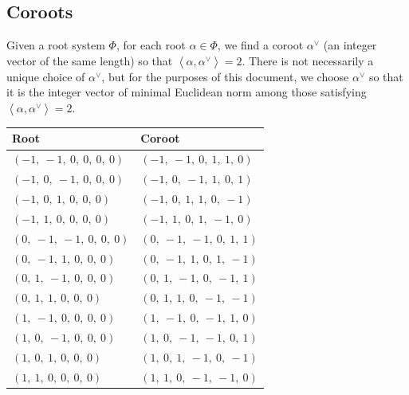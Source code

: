 \documentclass[11pt]{article}
\newcommand{\la}{\left\langle}
\newcommand{\ra}{\right\rangle}
\theoremstyle{definition}
\begin{document}
\subsection{Coroots}

Given a root system $\Phi$, for each root $\alpha \in \Phi$, we find a coroot $\alpha^\vee$ (an integer vector of the same length) so that $\la \alpha, \alpha^\vee \ra = 2$. There is not necessarily a unique choice of $\alpha^\vee$, but for the purposes of this document, we choose $\alpha^\vee$ so that it is the integer vector of minimal Euclidean norm among those satisfying $\la \alpha, \alpha^\vee \ra = 2$.

\bigskip

\noindent \begin{tabular}{|l|l|}
    \hline
    \textbf{Root} & \textbf{Coroot} \\
    \hline
    $\left( -1, \  -1, \  0, \  0, \  0, \  0\right)$ & $\left( -1, \  -1, \  0, \  1, \  1, \  0\right)$ \\
    \hline
    $\left( -1, \  0, \  -1, \  0, \  0, \  0\right)$ & $\left( -1, \  0, \  -1, \  1, \  0, \  1\right)$ \\
    \hline
    $\left( -1, \  0, \  1, \  0, \  0, \  0\right)$ & $\left( -1, \  0, \  1, \  1, \  0, \  -1\right)$ \\
    \hline
    $\left( -1, \  1, \  0, \  0, \  0, \  0\right)$ & $\left( -1, \  1, \  0, \  1, \  -1, \  0\right)$ \\
    \hline
    $\left( 0, \  -1, \  -1, \  0, \  0, \  0\right)$ & $\left( 0, \  -1, \  -1, \  0, \  1, \  1\right)$ \\
    \hline
    $\left( 0, \  -1, \  1, \  0, \  0, \  0\right)$ & $\left( 0, \  -1, \  1, \  0, \  1, \  -1\right)$ \\
    \hline
    $\left( 0, \  1, \  -1, \  0, \  0, \  0\right)$ & $\left( 0, \  1, \  -1, \  0, \  -1, \  1\right)$ \\
    \hline
    $\left( 0, \  1, \  1, \  0, \  0, \  0\right)$ & $\left( 0, \  1, \  1, \  0, \  -1, \  -1\right)$ \\
    \hline
    $\left( 1, \  -1, \  0, \  0, \  0, \  0\right)$ & $\left( 1, \  -1, \  0, \  -1, \  1, \  0\right)$ \\
    \hline
    $\left( 1, \  0, \  -1, \  0, \  0, \  0\right)$ & $\left( 1, \  0, \  -1, \  -1, \  0, \  1\right)$ \\
    \hline
    $\left( 1, \  0, \  1, \  0, \  0, \  0\right)$ & $\left( 1, \  0, \  1, \  -1, \  0, \  -1\right)$ \\
    \hline
    $\left( 1, \  1, \  0, \  0, \  0, \  0\right)$ & $\left( 1, \  1, \  0, \  -1, \  -1, \  0\right)$ \\
    \hline
\end{tabular}
\end{document}
